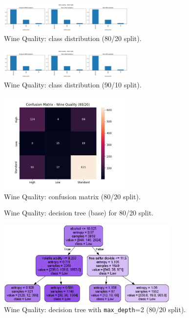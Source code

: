 \begin{figure}[H]
	\centering
	\includegraphics[width=0.6\textwidth]{imgs/class_dist/class_dist__wine_quality__80_vs_20.png}
	\caption{Wine Quality: class distribution (80/20 split).}
	\label{fig:wq-cd-80-20}
\end{figure}

\begin{figure}[H]
	\centering
	\includegraphics[width=0.6\textwidth]{imgs/class_dist/class_dist__wine_quality__90_vs_10.png}
	\caption{Wine Quality: class distribution (90/10 split).}
	\label{fig:wq-cd-90-10}
\end{figure}

\begin{figure}[H]
	\centering
	\includegraphics[width=0.6\textwidth]{imgs/confusion_mat/confusion_mat__wine_quality__80_vs_20.png}
	\caption{Wine Quality: confusion matrix (80/20 split).}
	\label{fig:wq-cm-80-20}
\end{figure}

\begin{figure}[H]
	\centering
	\caption{Wine Quality: decision tree (base) for 80/20 split.}
	\label{fig:wq-dt-base}
\end{figure}

\begin{figure}[H]
	\centering
	\includegraphics[width=0.8\textwidth]{imgs/dt/dt__wine_quality__80_vs_20__2.png}
	\caption{Wine Quality: decision tree with \texttt{max\_depth}=2 (80/20 split).}
	\label{fig:wq-dt-depth-2}
\end{figure}


